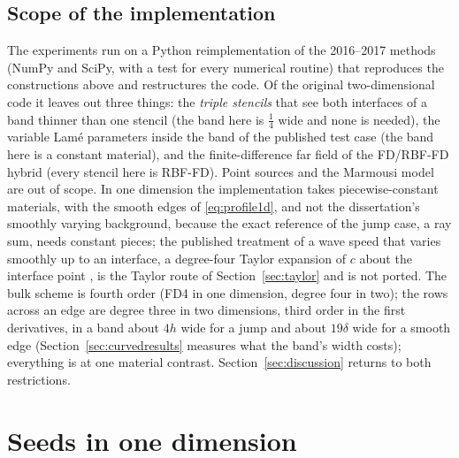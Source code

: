 \documentclass[11pt]{amsart}
\theoremstyle{definition}
\theoremstyle{remark}
\begin{document}
\subsection{Scope of the implementation}
\label{sec:scope}
The experiments run on a Python reimplementation of the 2016--2017
methods (NumPy and SciPy, with a test for every numerical routine) that
reproduces the constructions above and restructures the code. Of the
original two-dimensional code it leaves out three things: the
\emph{triple stencils} that see both interfaces of a band thinner than
one stencil (the band here is $\tfrac14$ wide and none is needed), the
variable Lam\'e parameters inside the band of the published test case
(the band here is a constant material), and the finite-difference far
field of the FD/RBF-FD hybrid (every stencil here is RBF-FD). Point
sources and the Marmousi model are out of scope. In one dimension the
implementation takes piecewise-constant materials, with the smooth edges
of \eqref{eq:profile1d}, and not the dissertation's smoothly varying
background, because the exact reference of the jump case, a ray sum,
needs constant pieces; the published treatment of a wave speed that
varies smoothly up to an interface, a degree-four Taylor expansion of
$c$ about the interface point \cite{Martin2016,MartinFornberg2017}, is
the Taylor route of Section~\ref{sec:taylor} and is not ported. The bulk scheme is fourth order (FD4 in one dimension, degree four in
two); the rows across an edge are degree three in two dimensions, third
order in the first derivatives, in a band about $4h$ wide for a jump and
about $19\delta$ wide for a smooth edge (Section~\ref{sec:curvedresults}
measures what the band's width costs); everything is at one material
contrast. Section~\ref{sec:discussion} returns to both restrictions.
\section{Seeds in one dimension}
\label{sec:seeds1d}
\end{document}
